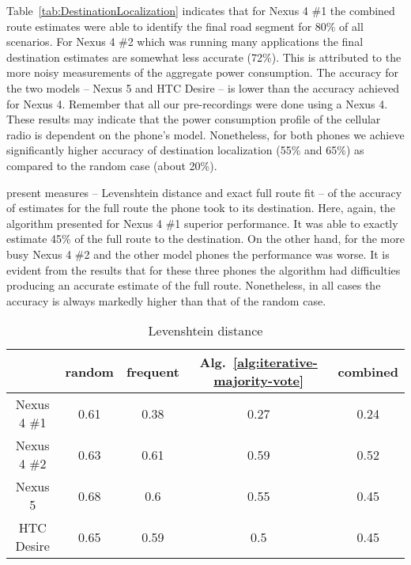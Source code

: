 Table~\ref{tab:DestinationLocalization}  indicates that for Nexus 4 \#1 the combined route estimates were able to identify the final road segment for
80\% of all scenarios. For Nexus 4 \#2 which was running many applications the final destination  estimates are somewhat less accurate (72\%). 
This is attributed to the more noisy measurements of the aggregate power consumption. 
The accuracy for the two models -- Nexus 5 and HTC Desire -- is lower than the accuracy achieved for Nexus 4. Remember that all our pre-recordings were done using a Nexus 4. These results may indicate that the power consumption profile of the cellular radio is dependent on the phone's model. Nonetheless, for both phones we achieve significantly higher accuracy of destination localization (55\% and 65\%) as compared to the random case (about 20\%).


 present measures -- Levenshtein distance and exact full route fit -- of the accuracy of estimates for the full route the phone took to its destination. Here, again, the algorithm presented for Nexus 4 \#1 superior performance. It was able to exactly estimate 45\% of the full route to the destination. On the other hand, for the more busy Nexus 4 \#2 and the other model phones the performance was worse. It is evident from the results that for these three phones the algorithm had difficulties producing an accurate estimate of the full route. Nonetheless, in all cases the accuracy is always markedly higher than that of the random case.


\begin{table}
	\centering
	\small
		\begin{tabular}{c|c|c|c|c|}
			\cline{2-5}
			& random & frequent & Alg.~\ref{alg:iterative-majority-vote} & combined \\
			\hline
			\multicolumn{1}{|c|}{Nexus 4 \#1} & 0.61 & 0.38 & 0.27 & 0.24 \\
			\hline
			\multicolumn{1}{|c|}{Nexus 4 \#2} & 0.63 & 0.61 & 0.59 & 0.52 \\
			\hline
			\multicolumn{1}{|c|}{Nexus 5} & 0.68 & 0.6 & 0.55 & 0.45 \\
			\hline
			\multicolumn{1}{|c|}{HTC Desire} & 0.65 & 0.59 & 0.5 & 0.45 \\
			\hline
		\end{tabular}
		\normalsize
	\caption{Levenshtein distance}
	\label{tab:LevenshteinDistance}
\end{table}

